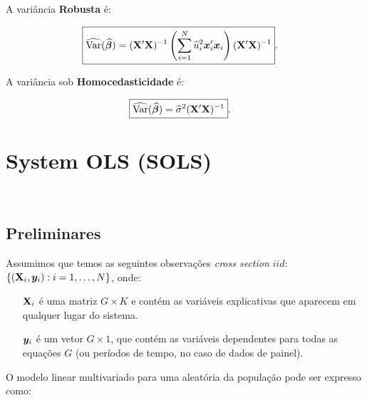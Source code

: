 \documentclass[11pt, oneside, a4paper, article]{article}
\numberwithin{equation}{section}
\begin{document}
A variância \textbf{Robusta} é:

\vspace{-1 em}
\begin{align*}
\Aboxed{
\widehat{\Var}(\betahatbold) &= 
(\Xmat'\Xmat)^{-1} 
\left( \sum_{i=1}^{N} \widehat{u}_{i}^{2} \mbs{x}_{i}' \mbs{x}_{i} \right)
(\Xmat'\Xmat)^{-1} }.
\end{align*}

A variância sob \textbf{Homocedasticidade} é:

\vspace{-1 em}
\begin{align*}
	\Aboxed{\widehat{\Var}(\betahatbold) &= \widehat{\sigma}^{2} (\Xmat' \Xmat)^{-1}} .
\end{align*}

\clearpage
\section{System OLS (SOLS)}

\noindent
\citet[C.7 -- Estimating Systems of Equations by OLS and GLS, p.143--179]{wool-2010}\\
\citet[Sec.7.3 -- System OLS Estimation of a Multivariate Linear System, p.147]{wool-2010} 

\subsection{Preliminares}
\noindent
\citet[Sec.7.3.1]{wool-2010}

Assumimos que temos as seguintes observações \textit{cross section} $iid$:
$\{ (\mathbf{X}_{i}, \boldsymbol{y}_{i}): i=1, \dots, N\}$, onde:

\vspace{-1 em}
\begin{itemize}[itemsep = -1ex]
\item [$\mathbf{X}_{i}$]  é uma matriz $G \times K$ e contém as variáveis explicativas que aparecem em qualquer lugar do sistema.
\item [$\boldsymbol{y}_{i}$]  é um vetor $G \times 1$, que contém as variáveis dependentes para todas as equações $G$ (ou períodos de tempo, no caso de dados de painel).
\end{itemize}

O modelo linear multivariado para uma  aleatória da população pode ser expresso como:
\end{document}
